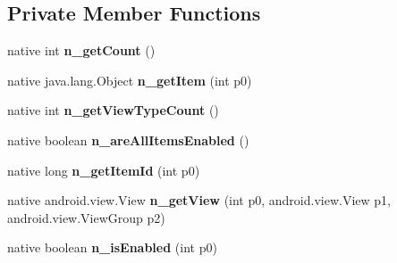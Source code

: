 \subsection*{Private Member Functions}
\begin{DoxyCompactItemize}
\item 
\mbox{\label{classmd5b60ffeb829f638581ab2bb9b1a7f4f3f_1_1TableViewModelRenderer_a1baebcca16ebfe05cca57f9f4a59955e}} 
native int {\bfseries n\+\_\+get\+Count} ()
\item 
\mbox{\label{classmd5b60ffeb829f638581ab2bb9b1a7f4f3f_1_1TableViewModelRenderer_a9ae34df1ef1e28d17eee02cd5ab39715}} 
native java.\+lang.\+Object {\bfseries n\+\_\+get\+Item} (int p0)
\item 
\mbox{\label{classmd5b60ffeb829f638581ab2bb9b1a7f4f3f_1_1TableViewModelRenderer_a1d2bbf52da896006bc3a9b6c93c86496}} 
native int {\bfseries n\+\_\+get\+View\+Type\+Count} ()
\item 
\mbox{\label{classmd5b60ffeb829f638581ab2bb9b1a7f4f3f_1_1TableViewModelRenderer_a070e14dfb258fab5686a96c5ab9e3d00}} 
native boolean {\bfseries n\+\_\+are\+All\+Items\+Enabled} ()
\item 
\mbox{\label{classmd5b60ffeb829f638581ab2bb9b1a7f4f3f_1_1TableViewModelRenderer_af599d3cec6b5efd9debfe5cd196d40d7}} 
native long {\bfseries n\+\_\+get\+Item\+Id} (int p0)
\item 
\mbox{\label{classmd5b60ffeb829f638581ab2bb9b1a7f4f3f_1_1TableViewModelRenderer_ad6d4f8ac83d1e67037a1478876267cb2}} 
native android.\+view.\+View {\bfseries n\+\_\+get\+View} (int p0, android.\+view.\+View p1, android.\+view.\+View\+Group p2)
\item 
\mbox{\label{classmd5b60ffeb829f638581ab2bb9b1a7f4f3f_1_1TableViewModelRenderer_a7b449214bcb7dcbee8c9881e873e6a3e}} 
native boolean {\bfseries n\+\_\+is\+Enabled} (int p0)
\end{DoxyCompactItemize}
